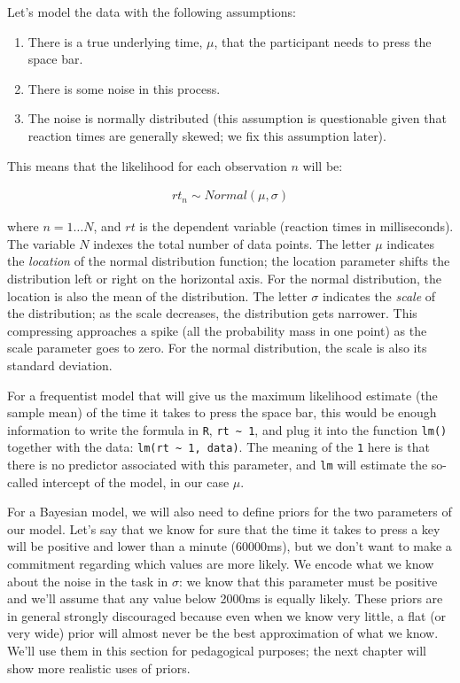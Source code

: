 \documentclass[12pt,]{krantz}
\providecommand{\tightlist}{%
  \setlength{\itemsep}{0pt}\setlength{\parskip}{0pt}}
\theoremstyle{definition}
\theoremstyle{definition}
\theoremstyle{definition}
\theoremstyle{remark}
\begin{document}
Let's model the data with the following assumptions:

\begin{enumerate}
\def\labelenumi{\arabic{enumi}.}
\tightlist
\item
  There is a true underlying time, \(\mu\), that the participant needs to press the space bar.
\item
  There is some noise in this process.
\item
  The noise is normally distributed (this assumption is questionable given that reaction times are generally skewed; we fix this assumption later).
\end{enumerate}

This means that the likelihood for each observation \(n\) will be:

\begin{equation}
\begin{aligned}
rt_n \sim Normal(\mu, \sigma)
\end{aligned}
\label{eq:rtlik}
\end{equation}

where \(n =1 \ldots N\), and \(rt\) is the dependent variable (reaction times in milliseconds). The variable \(N\) indexes the total number of data points. The letter \(\mu\) indicates the \emph{location} of the normal distribution function; the location parameter shifts the distribution left or right on the horizontal axis. For the normal distribution, the location is also the mean of the distribution. The letter \(\sigma\) indicates the \emph{scale} of the distribution; as the scale decreases, the distribution gets narrower. This compressing approaches a spike (all the probability mass in one point) as the scale parameter goes to zero. For the normal distribution, the scale is also its standard deviation.

For a frequentist model that will give us the maximum likelihood estimate (the sample mean) of the time it takes to press the space bar, this would be enough information to write the formula in \texttt{R}, \texttt{rt\ \textasciitilde{}\ 1}, and plug it into the function \texttt{lm()} together with the data: \texttt{lm(rt\ \textasciitilde{}\ 1,\ data)}. The meaning of the \texttt{1} here is that there is no predictor associated with this parameter, and \texttt{lm} will estimate the so-called intercept of the model, in our case \(\mu\).

For a Bayesian model, we will also need to define priors for the two parameters of our model. Let's say that we know for sure that the time it takes to press a key will be positive and lower than a minute (60000ms), but we don't want to make a commitment regarding which values are more likely. We encode what we know about the noise in the task in \(\sigma\): we know that this parameter must be positive and we'll assume that any value below 2000ms is equally likely. These priors are in general strongly discouraged because even when we know very little, a flat (or very wide) prior will almost never be the best approximation of what we know. We'll use them in this section for pedagogical purposes; the next chapter will show more realistic uses of priors.
\end{document}
